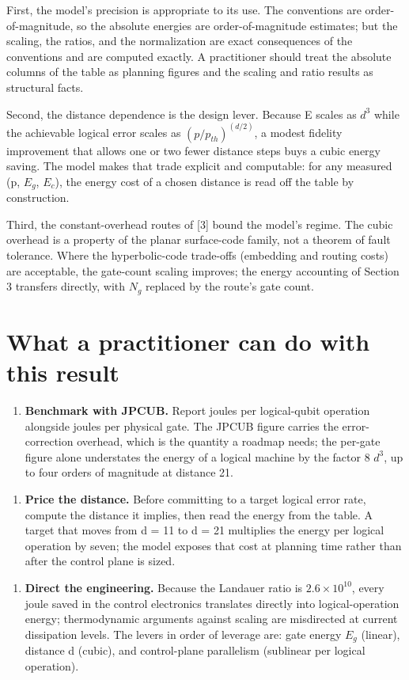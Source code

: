\documentclass[11pt]{article}
\begin{document}
First, the model's precision is appropriate to its use. The conventions are order-of-magnitude, so the absolute energies are order-of-magnitude estimates; but the scaling, the ratios, and the normalization are exact consequences of the conventions and are computed exactly. A practitioner should treat the absolute columns of the table as planning figures and the scaling and ratio results as structural facts.

Second, the distance dependence is the design lever. Because E scales as $d^{3}$ while the achievable logical error scales as $(p/p_{th})^{(d/2)}$, a modest fidelity improvement that allows one or two fewer distance steps buys a cubic energy saving. The model makes that trade explicit and computable: for any measured (p, $E_{g}$, $E_{c}$), the energy cost of a chosen distance is read off the table by construction.

Third, the constant-overhead routes of [3] bound the model's regime. The cubic overhead is a property of the planar surface-code family, not a theorem of fault tolerance. Where the hyperbolic-code trade-offs (embedding and routing costs) are acceptable, the gate-count scaling improves; the energy accounting of Section 3 transfers directly, with $N_{g}$ replaced by the route's gate count.

\section{What a practitioner can do with this result}
\begin{enumerate}
  \item \textbf{Benchmark with JPCUB.} Report joules per logical-qubit operation alongside joules per physical gate. The JPCUB figure carries the error-correction overhead, which is the quantity a roadmap needs; the per-gate figure alone understates the energy of a logical machine by the factor 8 $d^{3}$, up to four orders of magnitude at distance 21.
\end{enumerate}
\begin{enumerate}
  \item \textbf{Price the distance.} Before committing to a target logical error rate, compute the distance it implies, then read the energy from the table. A target that moves from d = 11 to d = 21 multiplies the energy per logical operation by seven; the model exposes that cost at planning time rather than after the control plane is sized.
\end{enumerate}
\begin{enumerate}
  \item \textbf{Direct the engineering.} Because the Landauer ratio is $2.6\times 10^{10}$, every joule saved in the control electronics translates directly into logical-operation energy; thermodynamic arguments against scaling are misdirected at current dissipation levels. The levers in order of leverage are: gate energy $E_{g}$ (linear), distance d (cubic), and control-plane parallelism (sublinear per logical operation).
\end{enumerate}
\end{document}
